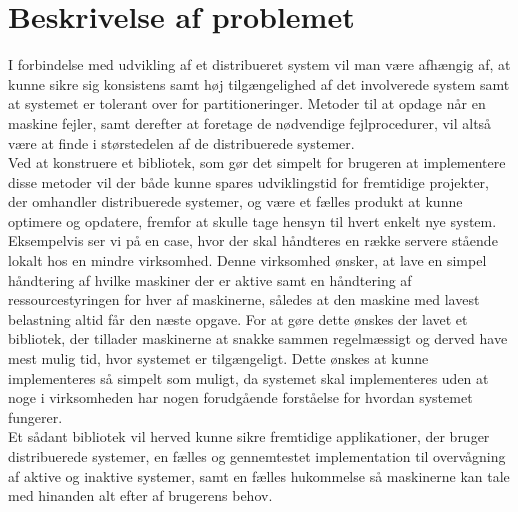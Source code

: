 \documentclass[a4paper,12pt]{article}
\begin{document}
\section{Beskrivelse af problemet}
I forbindelse med udvikling af et distribueret system vil man være afhængig af, at kunne sikre sig konsistens samt høj tilgængelighed af det involverede system samt at systemet er tolerant over for partitioneringer. Metoder til at opdage når en maskine fejler, samt derefter at foretage de nødvendige fejlprocedurer, vil altså være at finde i størstedelen af de distribuerede systemer.\\
Ved at konstruere et bibliotek, som gør det simpelt for brugeren at implementere disse metoder vil der både kunne spares udviklingstid for fremtidige projekter, der omhandler distribuerede systemer, og være et fælles produkt at kunne optimere og opdatere, fremfor at skulle tage hensyn til hvert enkelt nye system. 
\\
Eksempelvis ser vi på en case, hvor der skal håndteres en række servere stående lokalt hos en mindre virksomhed. Denne virksomhed ønsker, at lave en simpel håndtering af hvilke maskiner der er aktive samt en håndtering af ressourcestyringen for hver af maskinerne, således at den maskine med lavest belastning altid får den næste opgave. For at gøre dette ønskes der lavet et bibliotek, der tillader maskinerne at snakke sammen regelmæssigt og derved have mest mulig tid, hvor systemet er tilgængeligt. Dette ønskes at kunne implementeres så simpelt som muligt, da systemet skal implementeres uden at noge i virksomheden har nogen forudgående forståelse for hvordan systemet fungerer.
\\
Et sådant bibliotek vil herved kunne sikre fremtidige applikationer, der bruger distribuerede systemer, en fælles og gennemtestet implementation til overvågning af aktive og inaktive systemer, samt en fælles hukommelse så maskinerne kan tale med hinanden alt efter af brugerens behov.
\\
\end{document}
